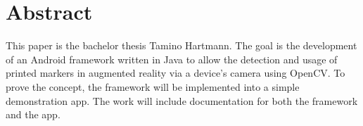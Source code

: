 \section*{Abstract}
This paper is the bachelor thesis Tamino Hartmann.
The goal is the development of an Android framework written in Java to allow the detection and usage of printed markers in augmented reality via a device's camera using OpenCV.
To prove the concept, the framework will be implemented into a simple demonstration app.
The work will include documentation for both the framework and the app.
